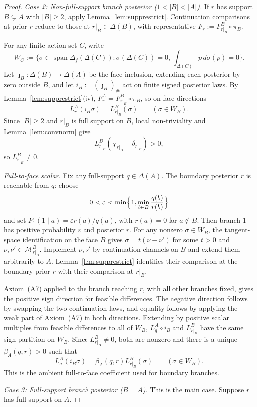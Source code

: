 \documentclass[11pt,a4paper]{article}
\theoremstyle{definition}
\newcommand{\1}{\mathbf 1}
\begin{document}
\begin{proof}
\emph{Case 2: Non-full-support branch posterior ($1<|B|<|A|$).}  If $r$ has support $B\subsetneq A$ with $|B|\ge 2$,
apply Lemma~\ref{lem:supprestrict}.  Continuation comparisons at prior $r$ reduce to those at $r|_B\in\Delta(B)$,
with representative $F_r:=F_{r|_B}^B\circ\pi_B$.

For any finite action set $C$, write
\[
W_C:=\{\sigma\in\operatorname{span}\Delta_f(\Delta(C)):\sigma(\Delta(C))=0,\ \textstyle\int_{\Delta(C)}p\,d\sigma(p)=0\}.
\]
Let $\jmath_B:\Delta(B)\to\Delta(A)$ be the face inclusion, extending each posterior by zero outside $B$, and let
$i_B:=(\jmath_B)_\#$ act on finite signed posterior laws.  By Lemma~\ref{lem:supprestrict}(iv),
$F_r^A=F_{r|_B}^B\circ\pi_B$, so on face directions
\[
L_r^A(i_B\sigma)=L_{r|_B}^B(\sigma)\qquad(\sigma\in W_B).
\]
Since $|B|\ge2$ and $r|_B$ is full support on $B$, local non-triviality and Lemma~\ref{lem:convnorm} give
\[
L_{r|_B}^B(\chi_{r|_B}-\delta_{r|_B})>0,
\]
so $L_{r|_B}^B\ne0$.

\emph{Full-to-face scalar.}  Fix any full-support $q\in\Delta(A)$.  The boundary posterior $r$ is reachable from $q$:
choose
\[
0<\varepsilon<\min\Bigl\{1,\min_{b\in B}\frac{q(b)}{r(b)}\Bigr\}
\]
and set $P_1(1\mid a)=\varepsilon r(a)/q(a)$, with $r(a)=0$ for $a\notin B$.  Then branch $1$ has positive probability
$\varepsilon$ and posterior $r$.  For any nonzero $\sigma\in W_B$, the tangent-space identification on the face $B$ gives
$\sigma=t(\nu-\nu')$ for some $t>0$ and $\nu,\nu'\in\mathcal M_{r|_B}^B$.  Implement $\nu,\nu'$ by continuation channels
on $B$ and extend them arbitrarily to $A$.  Lemma~\ref{lem:supprestrict} identifies their comparison at the boundary prior
$r$ with their comparison at $r|_B$.

Axiom~\textup{(A7)} applied to the branch reaching $r$, with all other branches fixed, gives the positive sign direction
for feasible differences.  The negative direction follows by swapping the two continuation laws, and equality follows by
applying the weak part of Axiom~\textup{(A7)} in both directions.  Extending by positive scalar multiples from feasible
differences to all of $W_B$, $L_q^A\circ i_B$ and $L_{r|_B}^B$ have the same sign partition on $W_B$.  Since
$L_{r|_B}^B\ne0$, both are nonzero and there is a unique $\beta_A(q,r)>0$ such that
\[
L_q^A(i_B\sigma)=\beta_A(q,r)L_{r|_B}^B(\sigma)\qquad(\sigma\in W_B).
\]
This is the ambient full-to-face coefficient used for boundary branches.

\emph{Case 3: Full-support branch posterior ($B=A$).}  This is the main case.  Suppose $r$ has full support on $A$.


\end{proof}
\end{document}
